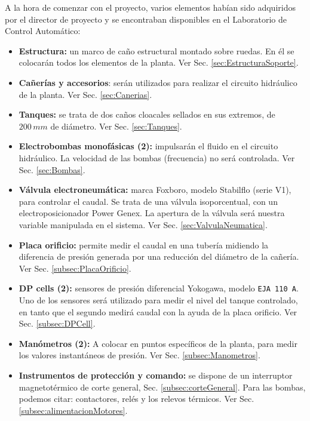 A la hora de comenzar con el proyecto, varios elementos habían
sido adquiridos por el director de proyecto y se encontraban
disponibles en el Laboratorio de Control Automático:
\begin{itemize}
  \item \textbf{Estructura:} un marco de caño estructural montado sobre
  ruedas. En él se colocarán todos los elementos de la planta.
  Ver Sec. \ref{sec:EstructuraSoporte}.

  \item \textbf{Cañerías y accesorios}: serán utilizados para realizar el
  circuito hidráulico de la planta. Ver Sec. \ref{sec:Canerias}.

  \item \textbf{Tanques:} se trata de dos caños cloacales sellados en sus
  extremos, de $200\,mm$ de diámetro. Ver Sec. \ref{sec:Tanques}.

  \item \textbf{Electrobombas monofásicas (2):} impulsarán el fluido
  en el circuito hidráulico.
  La velocidad de las bombas (frecuencia) no será controlada.
  Ver Sec. \ref{sec:Bombas}.

  \item \textbf{Válvula electroneumática:} marca Foxboro, modelo
  Stabilflo (serie V1), para controlar el caudal.
  Se trata de una válvula isoporcentual, con un electroposicionador
  Power Genex.
  La apertura de la válvula será nuestra variable manipulada en
  el sistema.
  Ver Sec. \ref{sec:ValvulaNeumatica}.

  \item \textbf{Placa orificio:} permite medir el
  caudal en una tubería midiendo la diferencia de presión generada por una 
  reducción del diámetro de la cañería. Ver Sec. \ref{subsec:PlacaOrificio}.

  \item \textbf{DP cells (2):} sensores de presión
  diferencial Yokogawa, modelo \verb|EJA 110 A|.
  Uno de los sensores será utilizado para medir el nivel del tanque controlado,
  en tanto que el segundo medirá caudal con la ayuda de la placa orificio.
  Ver Sec. \ref{subsec:DPCell}.

  \item \textbf{Manómetros (2):} A colocar en
  puntos específicos de la planta, para medir los valores instantáneos de
  presión.
  Ver Sec. \ref{subsec:Manometros}.

  \item \textbf{Instrumentos de protección y comando:}
  se dispone de un interruptor magnetotérmico de corte general,
  Sec. \ref{subsec:corteGeneral}.
  Para las bombas, podemos citar: contactores, relés y los relevos térmicos.
  Ver Sec. \ref{subsec:alimentacionMotores}.


\end{itemize}
